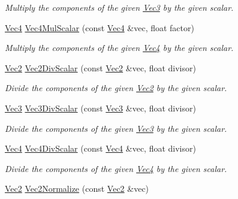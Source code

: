 \begin{DoxyCompactItemize}
\begin{DoxyCompactList}\small\item\em Multiply the components of the given \hyperlink{classgofxmath_1_1_vec3}{Vec3} by the given scalar. \end{DoxyCompactList}\item 
\hyperlink{classgofxmath_1_1_vec4}{Vec4} \hyperlink{group___s_i_s_d_vec_math_ga70441f2888f0df752fe0624a5a7b362d}{Vec4\+Mul\+Scalar} (const \hyperlink{classgofxmath_1_1_vec4}{Vec4} \&vec, float factor)
\begin{DoxyCompactList}\small\item\em Multiply the components of the given \hyperlink{classgofxmath_1_1_vec4}{Vec4} by the given scalar. \end{DoxyCompactList}\item 
\hyperlink{classgofxmath_1_1_vec2}{Vec2} \hyperlink{group___s_i_s_d_vec_math_ga8686be4c3f0ee27b05363661fb75a228}{Vec2\+Div\+Scalar} (const \hyperlink{classgofxmath_1_1_vec2}{Vec2} \&vec, float divisor)
\begin{DoxyCompactList}\small\item\em Divide the components of the given \hyperlink{classgofxmath_1_1_vec2}{Vec2} by the given scalar. \end{DoxyCompactList}\item 
\hyperlink{classgofxmath_1_1_vec3}{Vec3} \hyperlink{group___s_i_s_d_vec_math_ga8c2d0c0b9d70b417e598489374ef1f88}{Vec3\+Div\+Scalar} (const \hyperlink{classgofxmath_1_1_vec3}{Vec3} \&vec, float divisor)
\begin{DoxyCompactList}\small\item\em Divide the components of the given \hyperlink{classgofxmath_1_1_vec3}{Vec3} by the given scalar. \end{DoxyCompactList}\item 
\hyperlink{classgofxmath_1_1_vec4}{Vec4} \hyperlink{group___s_i_s_d_vec_math_ga670f1f6ebdadeaa2f656f153218fdee8}{Vec4\+Div\+Scalar} (const \hyperlink{classgofxmath_1_1_vec4}{Vec4} \&vec, float divisor)
\begin{DoxyCompactList}\small\item\em Divide the components of the given \hyperlink{classgofxmath_1_1_vec4}{Vec4} by the given scalar. \end{DoxyCompactList}\item 
\hyperlink{classgofxmath_1_1_vec2}{Vec2} \hyperlink{group___s_i_s_d_vec_math_gaa0125e18e221531bfc7d72d47cdf42d9}{Vec2\+Normalize} (const \hyperlink{classgofxmath_1_1_vec2}{Vec2} \&vec)

\end{DoxyCompactItemize}
